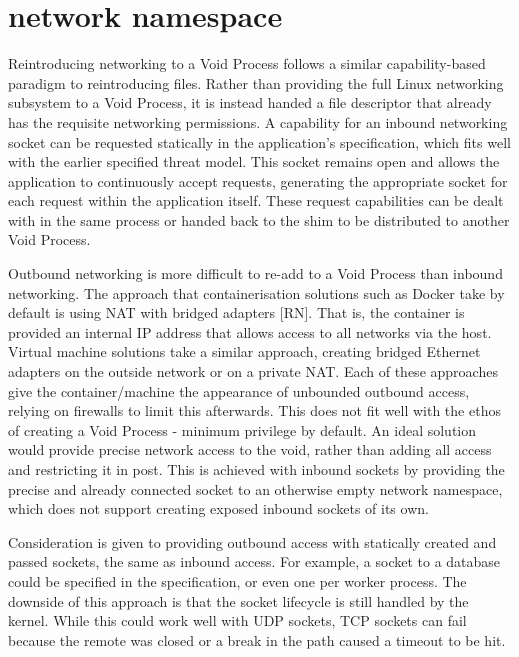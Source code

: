 \documentclass[12pt,a4paper,twoside]{report}
\begin{document}
\section{network namespace}
\label{sec:filling-net}

Reintroducing networking to a Void Process follows a similar capability-based paradigm to reintroducing files. Rather than providing the full Linux networking subsystem to a Void Process, it is instead handed a file descriptor that already has the requisite networking permissions. A capability for an inbound networking socket can be requested statically in the application's specification, which fits well with the earlier specified threat model. This socket remains open and allows the application to continuously accept requests, generating the appropriate socket for each request within the application itself. These request capabilities can be dealt with in the same process or handed back to the shim to be distributed to another Void Process.

Outbound networking is more difficult to re-add to a Void Process than inbound networking. The approach that containerisation solutions such as Docker take by default is using NAT with bridged adapters [RN]. That is, the container is provided an internal IP address that allows access to all networks via the host. Virtual machine solutions take a similar approach, creating bridged Ethernet adapters on the outside network or on a private NAT. Each of these approaches give the container/machine the appearance of unbounded outbound access, relying on firewalls to limit this afterwards. This does not fit well with the ethos of creating a Void Process - minimum privilege by default. An ideal solution would provide precise network access to the void, rather than adding all access and restricting it in post. This is achieved with inbound sockets by providing the precise and already connected socket to an otherwise empty network namespace, which does not support creating exposed inbound sockets of its own.

Consideration is given to providing outbound access with statically created and passed sockets, the same as inbound access. For example, a socket to a database could be specified in the specification, or even one per worker process. The downside of this approach is that the socket lifecycle is still handled by the kernel. While this could work well with UDP sockets, TCP sockets can fail because the remote was closed or a break in the path caused a timeout to be hit.
\end{document}
